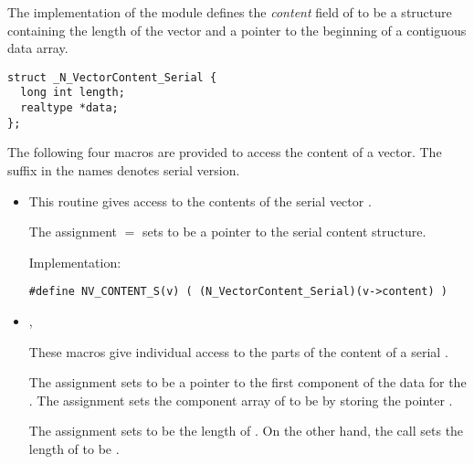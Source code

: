 
The {\nvecs} implementation of the {\nvector} module defines the {\em content} 
field of  to be a structure containing the length of the vector 
and a pointer to the beginning of a contiguous data array.
\begin{verbatim} 
struct _N_VectorContent_Serial {
  long int length;
  realtype *data;
};
\end{verbatim}
The following four macros are provided to access the content of a {\nvecs}
vector. The suffix  in the names denotes serial version.
\begin{itemize}

\item {}                             
    
  This routine gives access to the contents of the serial
  vector .
  
  The assignment  $=$  sets           
   to be a pointer to the serial  content  
  structure.                                             
                                                            
  Implementation: 
  
  \verb|#define NV_CONTENT_S(v) ( (N_VectorContent_Serial)(v->content) )|
  
\item {},                                  
                                                            
  These macros give individual access to the parts of    
  the content of a serial .                        
                                                               
  The assignment  sets  to be     
  a pointer to the first component of the data for the  . 
  The assignment  sets the component array of  to     
  be  by storing the pointer .                   
  
  The assignment  sets  to be     
  the length of . On the other hand, the call  
  sets the length of  to be .
                                                            

\end{itemize}
